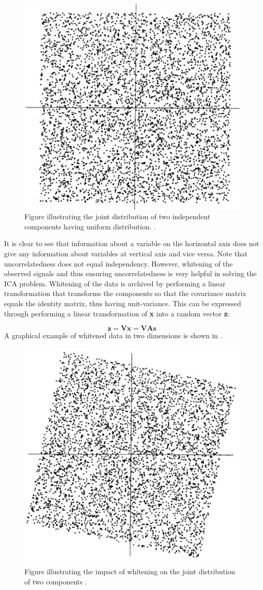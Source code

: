 \begin{figure}[H]                 
	\includegraphics[width=.35\textwidth]{figures/aBackground/independence}  
	\caption{Figure illustrating the joint distribution of two independent components having uniform distribution. \cite{Hyvarinen2000}.}
	\label{fig:back:independence} 
\end{figure}

It is clear to see that information about a variable on the horizontal axis does not give any information about variables at vertical axis and vice versa.  Note that uncorrelatedness does not equal independency. However, whitening of the observed signals and thus ensuring uncorrelatedness is very helpful in solving the ICA problem. Whitening of the data is archived by performing a linear transformation that transforms the components so that the covariance matrix equals the identity matrix, thus having unit-variance. 
This can be expressed through performing a linear transformation of \textbf{x} into a random vector \textbf{z}:

\begin{equation}
\mathbf{z} = \mathbf{V}\mathbf{x} = \mathbf{V}\mathbf{A}\mathbf{s} 
\end{equation}
A graphical example of whitened data in two dimensions is shown in   \cite{Hyvarinen2001,Hyvarinen2000}.

\begin{figure}[H]                 
	\includegraphics[width=.35\textwidth]{figures/aBackground/whitening}  
	\caption{Figure illustrating the impact of whitening on the joint distribution of two components \cite{Hyvarinen2000}.}
	\label{fig:back:whitening} 
\end{figure}

